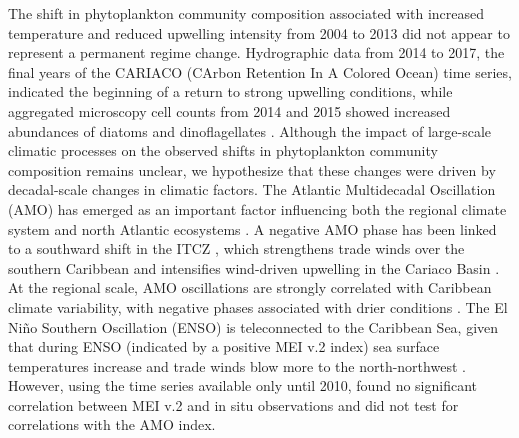 \documentclass[]{agujournal2019}
\begin{document}
The shift in phytoplankton community composition associated with increased temperature and reduced upwelling intensity from 2004 to 2013 did not appear to represent a permanent regime change.  Hydrographic data from 2014 to 2017, the final years of the CARIACO (CArbon Retention In A Colored Ocean) time series, indicated the beginning of a return to strong upwelling conditions, while aggregated microscopy cell counts from 2014 and 2015 showed increased abundances of diatoms and dinoflagellates \cite{muller-karger_scientific_2019}. Although the impact of large-scale climatic processes on the observed shifts in phytoplankton community composition remains unclear, we hypothesize that these changes were driven by decadal-scale changes in climatic factors. The Atlantic Multidecadal Oscillation (AMO) has emerged as an important factor influencing both the regional climate system and north Atlantic ecosystems \cite{nye_ecosystem_2014}.  A negative AMO phase has been linked to a southward shift in the ITCZ \cite{knight_climate_2006}, which strengthens trade winds over the southern Caribbean and intensifies wind-driven upwelling in the Cariaco Basin \cite{taylor_ecosystem_2012}. At the regional scale, AMO oscillations are strongly correlated with Caribbean climate variability, with negative phases associated with drier conditions \cite{stephenson_changes_2014}. The El Niño Southern Oscillation (ENSO) is teleconnected to the Caribbean Sea, given that during ENSO (indicated by a positive MEI v.2 index) sea surface temperatures increase and trade winds blow more to the north-northwest \cite{enfield_tropical_1997}. However, using the time series available only until 2010,  found no significant correlation between MEI v.2 and in situ observations and did not test for correlations with the AMO index.
\end{document}
